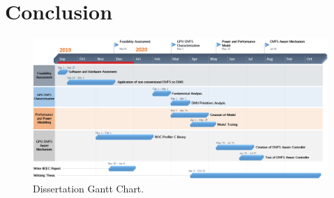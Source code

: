 
\chapter{Conclusion}
\label{chapter:conclusion}

\begin{figure}[!htb]
  \centering
  \includegraphics[width=1\textwidth]{Figures/Conclusion/Gantt.png}
  \caption[Conclusion]{Dissertation Gantt Chart.}
  \label{fig:gantt}
\end{figure}

